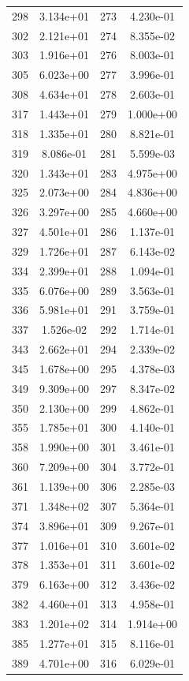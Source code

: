 \documentclass[12pt]{article}
\begin{document}
\begin{longtable}{@{}cccc@{}}
298 & 3.134e+01 & 273 & 4.230e-01 \\
302 & 2.121e+01 & 274 & 8.355e-02 \\
303 & 1.916e+01 & 276 & 8.003e-01 \\
305 & 6.023e+00 & 277 & 3.996e-01 \\
308 & 4.634e+01 & 278 & 2.603e-01 \\
317 & 1.443e+01 & 279 & 1.000e+00 \\
318 & 1.335e+01 & 280 & 8.821e-01 \\
319 & 8.086e-01 & 281 & 5.599e-03 \\
320 & 1.343e+01 & 283 & 4.975e+00 \\
325 & 2.073e+00 & 284 & 4.836e+00 \\
326 & 3.297e+00 & 285 & 4.660e+00 \\
327 & 4.501e+01 & 286 & 1.137e-01 \\
329 & 1.726e+01 & 287 & 6.143e-02 \\
334 & 2.399e+01 & 288 & 1.094e-01 \\
335 & 6.076e+00 & 289 & 3.563e-01 \\
336 & 5.981e+01 & 291 & 3.759e-01 \\
337 & 1.526e-02 & 292 & 1.714e-01 \\
343 & 2.662e+01 & 294 & 2.339e-02 \\
345 & 1.678e+00 & 295 & 4.378e-03 \\
349 & 9.309e+00 & 297 & 8.347e-02 \\
350 & 2.130e+00 & 299 & 4.862e-01 \\
355 & 1.785e+01 & 300 & 4.140e-01 \\
358 & 1.990e+00 & 301 & 3.461e-01 \\
360 & 7.209e+00 & 304 & 3.772e-01 \\
361 & 1.139e+00 & 306 & 2.285e-03 \\
371 & 1.348e+02 & 307 & 5.364e-01 \\
374 & 3.896e+01 & 309 & 9.267e-01 \\
377 & 1.016e+01 & 310 & 3.601e-02 \\
378 & 1.353e+01 & 311 & 3.601e-02 \\
379 & 6.163e+00 & 312 & 3.436e-02 \\
382 & 4.460e+01 & 313 & 4.958e-01 \\
383 & 1.201e+02 & 314 & 1.914e+00 \\
385 & 1.277e+01 & 315 & 8.116e-01 \\
389 & 4.701e+00 & 316 & 6.029e-01 \\

\end{longtable}
\end{document}

